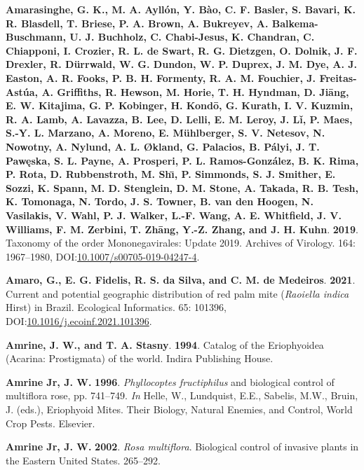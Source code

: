 \documentclass[12pt,final,CPage]{ufthesis}
\newlength{\cslhangindent}
\newenvironment{CSLReferences}[2] %
{%
	\setlength{\parindent}{0pt}
	\ifodd #1 \everypar{\setlength{\hangindent}{\cslhangindent}}\ignorespaces\fi
	\ifnum #2 > 0
	\setlength{\parskip}{#2\baselineskip}
	\fi
}%
{}
\begin{document}
{\begin{CSLReferences}{1}{0}
  \leavevmode{}%
  \textbf{Amarasinghe, G. K., M. A. Ayllón, Y. Bào, C. F. Basler, S. Bavari, K. R. Blasdell, T. Briese, P. A. Brown, A. Bukreyev, A. Balkema-Buschmann, U. J. Buchholz, C. Chabi-Jesus, K. Chandran, C. Chiapponi, I. Crozier, R. L. de Swart, R. G. Dietzgen, O. Dolnik, J. F. Drexler, R. Dürrwald, W. G. Dundon, W. P. Duprex, J. M. Dye, A. J. Easton, A. R. Fooks, P. B. H. Formenty, R. A. M. Fouchier, J. Freitas-Astúa, A. Griffiths, R. Hewson, M. Horie, T. H. Hyndman, D. Jiāng, E. W. Kitajima, G. P. Kobinger, H. Kondō, G. Kurath, I. V. Kuzmin, R. A. Lamb, A. Lavazza, B. Lee, D. Lelli, E. M. Leroy, J. Lǐ, P. Maes, S.-Y. L. Marzano, A. Moreno, E. Mühlberger, S. V. Netesov, N. Nowotny, A. Nylund, A. L. Økland, G. Palacios, B. Pályi, J. T. Pawęska, S. L. Payne, A. Prosperi, P. L. Ramos-González, B. K. Rima, P. Rota, D. Rubbenstroth, M. Shı̄, P. Simmonds, S. J. Smither, E. Sozzi, K. Spann, M. D. Stenglein, D. M. Stone, A. Takada, R. B. Tesh, K. Tomonaga, N. Tordo, J. S. Towner, B. van den Hoogen, N. Vasilakis, V. Wahl, P. J. Walker, L.-F. Wang, A. E. Whitfield, J. V. Williams, F. M. Zerbini, T. Zhāng, Y.-Z. Zhang, and J. H. Kuhn}. \textbf{2019}. Taxonomy of the order {Mononegavirales}: Update 2019. Archives of Virology. 164: 1967--1980, DOI:\href{https://doi.org/10.1007/s00705-019-04247-4}{10.1007/s00705-019-04247-4}.

  \leavevmode{}%
  \textbf{Amaro, G., E. G. Fidelis, R. S. da Silva, and C. M. de Medeiros}. \textbf{2021}. Current and potential geographic distribution of red palm mite ({\emph{Raoiella indica}} {Hirst}) in {Brazil}. Ecological Informatics. 65: 101396, DOI:\href{https://doi.org/10.1016/j.ecoinf.2021.101396}{10.1016/j.ecoinf.2021.101396}.

  \leavevmode{}%
  \textbf{Amrine, J. W., and T. A. Stasny}. \textbf{1994}. Catalog of the {Eriophyoidea} ({Acarina}: {Prostigmata}) of the world. Indira Publishing House.

  \leavevmode{}%
  \textbf{Amrine Jr, J. W.} \textbf{1996}. {\emph{Phyllocoptes fructiphilus}} and biological control of multiflora rose, pp. 741--749. \emph{In} Helle, W., Lundquist, E.E., Sabelis, M.W., Bruin, J. (eds.), Eriophyoid Mites. Their Biology, Natural Enemies, and Control, World Crop Pests. Elsevier.

  \leavevmode{}%
  \textbf{Amrine Jr, J. W.} \textbf{2002}. {\emph{Rosa multiflora}}. Biological control of invasive plants in the Eastern {United States}. 265--292.


\end{CSLReferences}}
\end{document}
